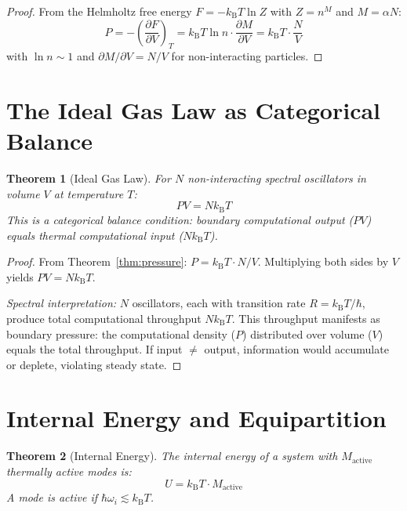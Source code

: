 \documentclass[twocolumn,10pt,a4paper]{article}
\theoremstyle{plain}
\newtheorem{theorem}{Theorem}[section]
\theoremstyle{definition}
\theoremstyle{remark}
\newcommand{\kB}{k_{\mathrm{B}}}
\begin{document}
\begin{proof}
From the Helmholtz free energy $F = -\kB T \ln Z$ with $Z = n^M$ and $M = \alpha N$:
\begin{equation}
    P = -\left(\frac{\partial F}{\partial V}\right)_T = \kB T \ln n \cdot \frac{\partial M}{\partial V} = \kB T \cdot \frac{N}{V}
\end{equation}
with $\ln n \sim 1$ and $\partial M/\partial V = N/V$ for non-interacting particles.
\end{proof}

\section{The Ideal Gas Law as Categorical Balance}
\label{sec:ideal_gas}

\begin{theorem}[Ideal Gas Law]
\label{thm:ideal_gas}
For $N$ non-interacting spectral oscillators in volume $V$ at temperature $T$:
\begin{equation}
\boxed{PV = N\kB T}
\end{equation}
This is a categorical balance condition: boundary computational output ($PV$) equals thermal computational input ($N\kB T$).
\end{theorem}

\begin{proof}
From Theorem~\ref{thm:pressure}: $P = \kB T \cdot N/V$. Multiplying both sides by $V$ yields $PV = N\kB T$.

\emph{Spectral interpretation:} $N$ oscillators, each with transition rate $R = \kB T/\hbar$, produce total computational throughput $N\kB T$. This throughput manifests as boundary pressure: the computational density ($P$) distributed over volume ($V$) equals the total throughput. If input $\neq$ output, information would accumulate or deplete, violating steady state.
\end{proof}

\section{Internal Energy and Equipartition}
\label{sec:energy}

\begin{theorem}[Internal Energy]
\label{thm:energy}
The internal energy of a system with $M_{\mathrm{active}}$ thermally active modes is:
\begin{equation}
    U = \kB T \cdot M_{\mathrm{active}}
\end{equation}
A mode is active if $\hbar\omega_i \lesssim \kB T$.
\end{theorem}
\end{document}
